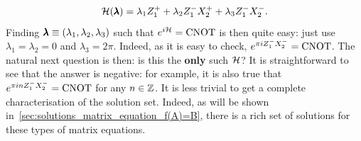 \begin{example}[label=ex:eigendecomposition_cnot]
\begin{equation}
    \mathcal{H}(\pmb{\lambda}) = \lambda_1 Z_1^+ + \lambda_2 Z_1^- X_2^+ + \lambda_3 Z_1^- X_2^-.
\end{equation}
Finding $\pmb{\lambda}\equiv(\lambda_1,\lambda_2,\lambda_3)$ such that $e^{i\mathcal{H}}=\operatorname{CNOT}$ is then quite easy: just use $\lambda_1=\lambda_2=0$ and $\lambda_3=2\pi$. Indeed, as it is easy to check, $e^{\pi i Z_1^- X_2^-} = \operatorname{CNOT}$.
The natural next question is then: is this the \textbf{only} such $\mathcal{H}$? It is straightforward to see that the answer is negative: for example, it is also true that $e^{\pi i n Z_1^- X_2^-}=\operatorname{CNOT}$ for any $n\in\mathbb{Z}$.
It is less trivial to get a complete characterisation of the solution set.
Indeed, as will be shown in~\cref{sec:solutions_matrix_equation_f(A)=B}, there is a rich set of solutions for these types of matrix equations.
\end{example}

